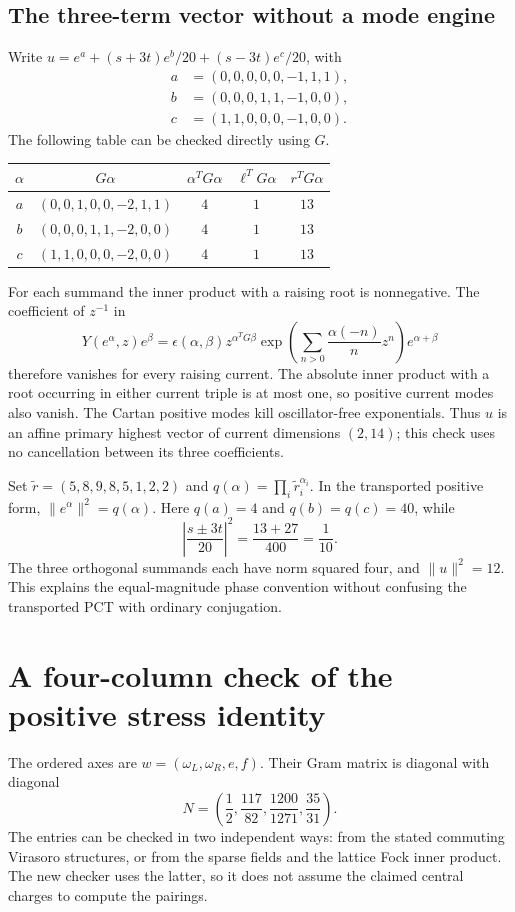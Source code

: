 \subsection{The three-term vector without a mode engine}
\label{hr:three-term-vector}
Write $u=e^a+(s+3t)e^b/20+(s-3t)e^c/20$, with
\[
\begin{split}
a&=(0,0,0,0,0,-1,1,1),\\
b&=(0,0,0,1,1,-1,0,0),\\
c&=(1,1,0,0,0,-1,0,0).
\end{split}
\]
The following table can be checked directly using $G$.
\begin{center}\small
\begin{tabular}{@{}ccccc@{}}\toprule
$\alpha$ & $G\alpha$ & $\alpha^TG\alpha$ & $\ell^TG\alpha$ & $r^TG\alpha$\\\midrule
$a$ & $(0,0,1,0,0,-2,1,1)$ & $4$ & $1$ & $13$\\
$b$ & $(0,0,0,1,1,-2,0,0)$ & $4$ & $1$ & $13$\\
$c$ & $(1,1,0,0,0,-2,0,0)$ & $4$ & $1$ & $13$\\\bottomrule
\end{tabular}\end{center}
For each summand the inner product with a raising root is nonnegative.
The coefficient of $z^{-1}$ in
\[
Y(e^\alpha,z)e^\beta
=\epsilon(\alpha,\beta)z^{\alpha^TG\beta}
\exp\left(\sum_{n>0}\frac{\alpha(-n)}n z^n\right)e^{\alpha+\beta}
\]
therefore vanishes for every raising current. The absolute inner
product with a root occurring in either current triple is at most one,
so positive current modes also vanish. The Cartan positive modes kill
oscillator-free exponentials. Thus $u$ is an affine primary highest
vector of current dimensions $(2,14)$; this check uses no cancellation
between its three coefficients.

Set $\widetilde r=(5,8,9,8,5,1,2,2)$ and
$q(\alpha)=\prod_i\widetilde r_i^{\alpha_i}$. In the transported
positive form, $\|e^\alpha\|^2=q(\alpha)$. Here
$q(a)=4$ and $q(b)=q(c)=40$, while
\[
\left|\frac{s\pm3t}{20}\right|^2=\frac{13+27}{400}=\frac1{10}.
\]
The three orthogonal summands each have norm squared four, and
$\|u\|^2=12$. This explains the equal-magnitude phase convention
without confusing the transported PCT with ordinary conjugation.

\section{A four-column check of the positive stress identity}
\label{hr:positive-stress-check}
The ordered axes are $w=(\omega_L,\omega_R,e,f)$. Their Gram matrix
is diagonal with diagonal
\[
N=\left(\frac12,\frac{117}{82},\frac{1200}{1271},\frac{35}{31}\right).
\]
The entries can be checked in two independent ways: from the stated
commuting Virasoro structures, or from the sparse fields and the lattice
Fock inner product. The new checker uses the latter, so it does not
assume the claimed central charges to compute the pairings.

